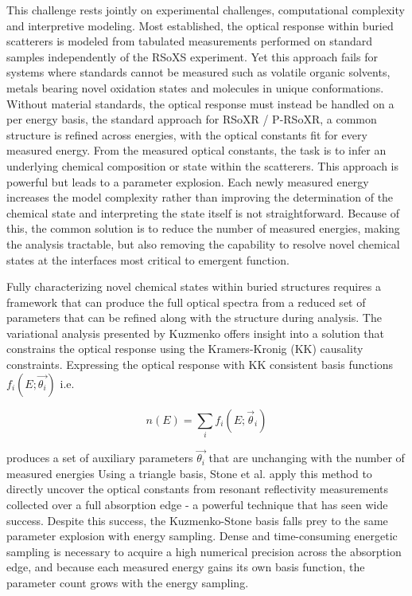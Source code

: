 This challenge rests jointly on experimental challenges, computational complexity and interpretive modeling. Most established, the optical response within buried scatterers is modeled from tabulated measurements performed on standard samples independently of the RSoXS experiment. Yet this approach fails for systems where standards cannot be measured such as volatile organic solvents, metals bearing novel oxidation states and molecules in unique conformations. Without material standards, the optical response must instead be handled on a per energy basis, the standard approach for RSoXR / P-RSoXR, a common structure is refined across energies, with the optical constants fit for every measured energy. From the measured optical constants, the task is to infer an underlying chemical composition or state within the scatterers. This approach is powerful but leads to a parameter explosion. Each newly measured energy increases the model complexity rather than improving the determination of the chemical state and interpreting the state itself is not straightforward. Because of this, the common solution is to reduce the number of measured energies, making the analysis tractable, but also removing the capability to resolve novel chemical states at the interfaces most critical to emergent function.

Fully characterizing novel chemical states within buried structures requires a framework that can produce the full optical spectra from a reduced set of parameters that can be refined along with the structure during analysis. The variational analysis presented by Kuzmenko offers insight into a solution that constrains the optical response using the Kramers-Kronig (KK) causality constraints. Expressing the optical response with KK consistent basis functions \(f_{i}\left( E;\overrightarrow{\theta_{i}} \right)\) i.e.

\begin{equation}
  n(E) = \sum_{i} f_{i}\left( E;\vec{\theta}_{i} \right)
  \label{eq:basis-sum}
\end{equation}

produces a set of auxiliary parameters \(\overrightarrow{\theta_{i}}\) that are unchanging with the number of measured energies\autocite{kuzmenkoKramersKronigConstrained2005} Using a triangle basis, Stone et al. apply this method to directly uncover the optical constants from resonant reflectivity measurements collected over a full absorption edge - a powerful technique that has seen wide success.\autocite{stoneKramersKronigConstrainedModeling2012,mackeMagneticReflectometryHeterostructures2014,dipaloAttosecondAbsorptionReflection2024,corbaeProbingCoordinationEnvironments2026a} Despite this success, the Kuzmenko-Stone basis falls prey to the same parameter explosion with energy sampling. Dense and time-consuming energetic sampling is necessary to acquire a high numerical precision across the absorption edge, and because each measured energy gains its own basis function, the parameter count grows with the energy sampling.

